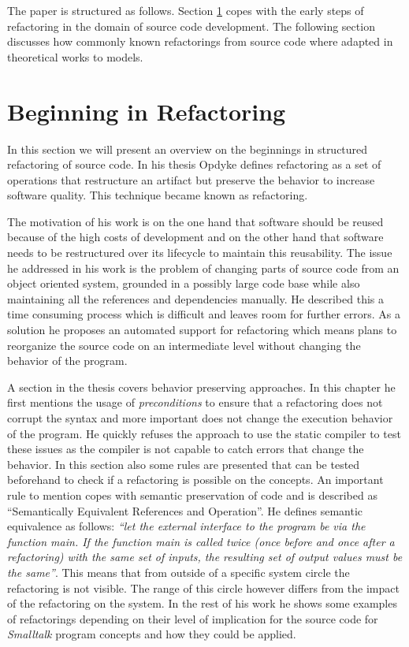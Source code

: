 \documentclass{llncs}
\begin{document}
The paper is structured as follows. Section \ref{sec:beginning} copes with the early steps of refactoring in the domain of source code development. The following section discusses how commonly known refactorings from source code where adapted in theoretical works to models.

\section{Beginning in Refactoring}
\label{sec:beginning}

In this section we will present an overview on the beginnings in structured refactoring of source code. In his thesis \cite{mast:REFOOF} Opdyke defines refactoring as a set of operations that restructure an artifact but preserve the behavior to increase software quality. This technique became known as refactoring.

The motivation of his work is on the one hand that software should be reused because of the high costs of development and on the other hand that software needs to be restructured over its lifecycle to maintain this reusability. The issue he addressed in his work is the problem of changing parts of source code from an object oriented system, grounded in a possibly large code base while also maintaining all the references and dependencies manually. He described this a time consuming process which is difficult and leaves room for further errors. As a solution he proposes an automated support for refactoring which means plans to reorganize the source code on an intermediate level without changing the behavior of the program.

A section in the thesis covers behavior preserving approaches. In this chapter he first mentions the usage of \textit{preconditions} to ensure that a refactoring does not corrupt the syntax and more important does not change the execution behavior of the program. He quickly refuses the approach to use the static compiler to test these issues as the compiler is not capable to catch errors that change the behavior. In this section also some rules are presented that can be tested beforehand to check if a refactoring is possible on the concepts. An important rule to mention copes with semantic preservation of code and is described as ``Semantically Equivalent References and Operation''. He defines semantic equivalence as follows: \textit{``let the external interface to the program be via the function main. If the function main is called twice (once before and once after a refactoring) with the same set of inputs, the resulting set of output values must be the same''}. This means that from 
outside of a specific system circle the refactoring is not visible. The range of this circle however differs from the impact of the refactoring on the system. In the rest of his work he shows some examples of refactorings depending on their level of implication for the source code for \textit{Smalltalk} program concepts and how they could be applied.
\end{document}
